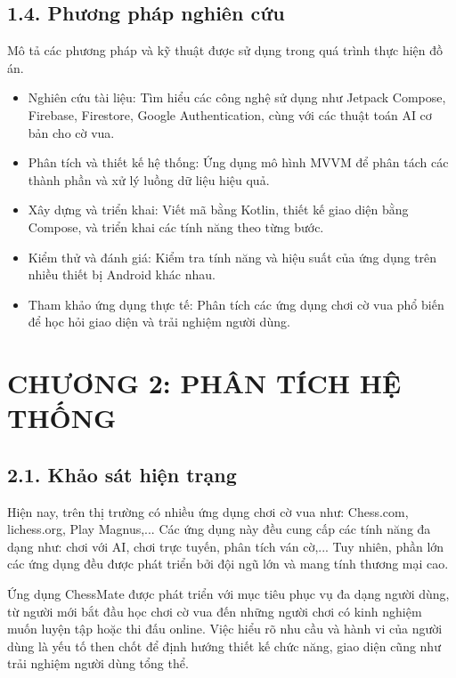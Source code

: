 \documentclass[a4paper,12pt]{article}
\begin{document}
\subsection*{1.4. Phương pháp nghiên cứu}

\justify
\noindent Mô tả các phương pháp và kỹ thuật được sử dụng trong quá trình thực hiện đồ án.
\begin{itemize}[label=·]
    \item Nghiên cứu tài liệu: Tìm hiểu các công nghệ sử dụng như Jetpack Compose, Firebase, Firestore, Google Authentication, cùng với các thuật toán AI cơ bản cho cờ vua.
    \item Phân tích và thiết kế hệ thống: Ứng dụng mô hình MVVM để phân tách các thành phần và xử lý luồng dữ liệu hiệu quả.
    \item Xây dựng và triển khai: Viết mã bằng Kotlin, thiết kế giao diện bằng Compose, và triển khai các tính năng theo từng bước.
    \item Kiểm thử và đánh giá: Kiểm tra tính năng và hiệu suất của ứng dụng trên nhiều thiết bị Android khác nhau.
    \item Tham khảo ứng dụng thực tế: Phân tích các ứng dụng chơi cờ vua phổ biến để học hỏi giao diện và trải nghiệm người dùng.
\end{itemize}

\section*{\centering \textbf{CHƯƠNG 2: PHÂN TÍCH HỆ THỐNG}} %

\subsection*{2.1. Khảo sát hiện trạng}

\justify
\noindent Hiện nay, trên thị trường có nhiều ứng dụng chơi cờ vua như: Chess.com, lichess.org, Play Magnus,... Các ứng dụng này đều cung cấp các tính năng đa dạng như: chơi với AI, chơi trực tuyến, phân tích ván cờ,... Tuy nhiên, phần lớn các ứng dụng đều được phát triển bởi đội ngũ lớn và mang tính thương mại cao.

\noindent Ứng dụng ChessMate được phát triển với mục tiêu phục vụ đa dạng người dùng, từ người mới bắt đầu học chơi cờ vua đến những người chơi có kinh nghiệm muốn luyện tập hoặc thi đấu online. Việc hiểu rõ nhu cầu và hành vi của người dùng là yếu tố then chốt để định hướng thiết kế chức năng, giao diện cũng như trải nghiệm người dùng tổng thể.
\end{document}

